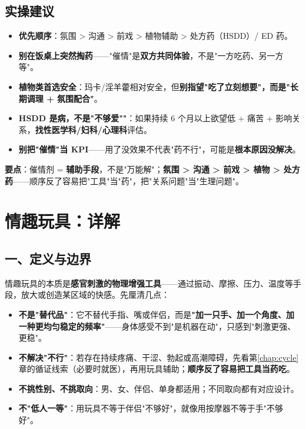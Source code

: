 \documentclass[12pt,UTF8,openany]{ctexbook}
\begin{document}
\subsection*{实操建议}
\begin{itemize}[leftmargin=2em,itemsep=0.3em]
  \item \textbf{优先顺序}：氛围 > 沟通 > 前戏 > 植物辅助 > 处方药（HSDD）/ ED 药。
  \item \textbf{别在饭桌上突然掏药}——"催情"是\textbf{双方共同体验}，不是"一方吃药、另一方等"。
  \item \textbf{植物类首选安全}：玛卡/淫羊藿相对安全，但\textbf{别指望"吃了立刻想要"，而是"长期调理 + 氛围配合"}。
  \item \textbf{HSDD 是病，不是"不够爱""}：如果持续 6 个月以上欲望低 + 痛苦 + 影响关系，\textbf{找性医学科/妇科/心理科}评估。
  \item \textbf{别把"催情"当 KPI}——用了没效果不代表"药不行"，可能是\textbf{根本原因没解决}。
\end{itemize}

\noindent\textbf{要点}：催情剂 = \textbf{辅助手段}，不是"万能解"；\textbf{氛围 > 沟通 > 前戏 > 植物 > 处方药}——顺序反了容易把"工具"当"药"，把"关系问题"当"生理问题"。

\section{情趣玩具：详解}

\subsection*{一、定义与边界}
情趣玩具的本质是\textbf{感官刺激的物理增强工具}——通过振动、摩擦、压力、温度等手段，放大或创造某区域的快感。先厘清几点：
\begin{itemize}[leftmargin=2em,itemsep=0.3em]
  \item \textbf{不是"替代品"}：它不替代手指、嘴或伴侣，而是\textbf{"加一只手、加一个角度、加一种更均匀稳定的频率"}——身体感受不到"是机器在动"，只感到"刺激更强、更稳"。
  \item \textbf{不解决"不行"}：若存在持续疼痛、干涩、勃起或高潮障碍，先看第\ref{chap:cycle}章的循证线索（必要时就医），再用玩具辅助；\textbf{顺序反了容易把工具当药吃}。
  \item \textbf{不挑性别、不挑取向}：男、女、伴侣、单身都适用；不同取向都有对应设计。
  \item \textbf{不"低人一等"}：用玩具不等于伴侣"不够好"，就像用按摩器不等于手"不够好"。
\end{itemize}
\end{document}

